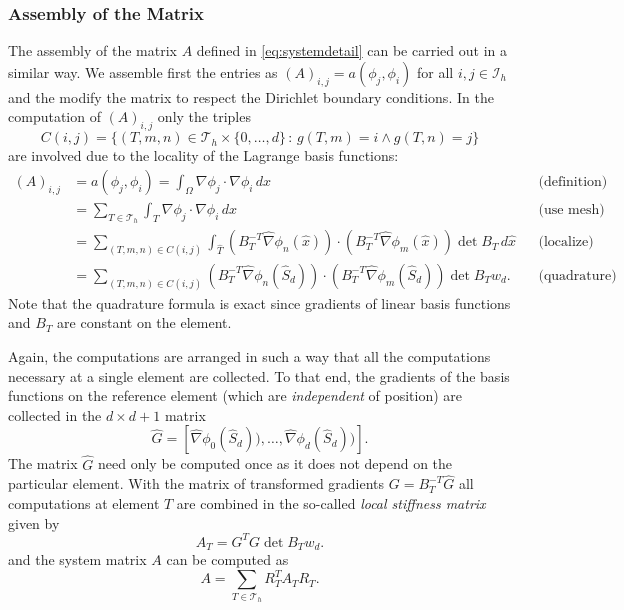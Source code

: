 \documentclass[a4paper,12pt]{article}
\begin{document}
\subsubsection*{Assembly of the Matrix}

The assembly of the matrix $A$ defined in \eqref{eq:systemdetail} can be carried
out in a similar way. We assemble first the entries as $(A)_{i,j}=a(\phi_j,\phi_i)$
for all $i,j\in\mathcal{I}_h$ and the modify the matrix to respect the Dirichlet
boundary conditions. In the computation of $(A)_{i,j}$ only the triples
$$C(i,j) = \{(T,m,n)\in\mathcal{T}_h\times\{0,\ldots,d\} \,:\, g(T,m)=i \wedge g(T,n)=j\}$$
are involved due to the locality of the Lagrange basis functions:
\begin{align*}
(A)_{i,j} &= a(\phi_j,\phi_i) = \int_\Omega \nabla \phi_j \cdot \nabla \phi_i \,dx 
&&\text{(definition)}\\
&= \sum_{T\in\mathcal{T}_h} \int_T \nabla \phi_j \cdot \nabla \phi_i \,dx
&&\text{(use mesh)}\\
&= \sum_{(T,m,n)\in C(i,j)}
\int_{\hat T} (B_T^{-T} \hat\nabla\phi_n(\hat x))\cdot (B_T^{-T} \hat\nabla\phi_m(\hat x))
\det B_T \,d\hat x &&\text{(localize)}\\
&= \sum_{(T,m,n)\in C(i,j)}
(B_T^{-T} \hat\nabla\phi_n(\hat S_d))\cdot (B_T^{-T} \hat\nabla\phi_m(\hat S_d))
\det B_T w_d . &&\text{(quadrature)}
\end{align*}
Note that the quadrature formula is exact since gradients of linear basis functions
and $B_T$ are constant on the element.

Again, the computations are arranged in such a way that all the computations
necessary at a single element are collected. To that end,
the gradients of the basis functions on the reference element (which are {\em independent}
of position) are collected in the $d\times d+1$ matrix
\begin{equation*}
\hat G = \left[\hat\nabla\phi_0(\hat S_d)),\ldots,\hat\nabla\phi_d(\hat S_d))\right] .
\end{equation*}
The matrix $\hat G$ need only be computed once as it does not depend on the
particular element.
With the matrix of transformed gradients $G=B_T^{-T} \hat G$
all computations at element $T$ are 
combined in the so-called {\em local stiffness matrix} given by
\begin{equation}
A_T = G^T G \det B_T w_d .
\label{eq:jacobian_volume}
\end{equation}
and the system matrix $A$ can be computed as
\begin{equation}
A =  \sum_{T\in\mathcal{T}_h} R_T^T A_T R_T .
\label{eq:matrixassembly}
\end{equation}
\end{document}
